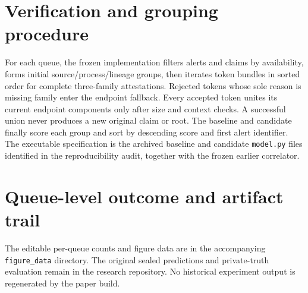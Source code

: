 \section{Verification and grouping procedure}
For each queue, the frozen implementation filters alerts and claims by availability, forms initial source/process/lineage groups, then iterates token bundles in sorted order for complete three-family attestations. Rejected tokens whose sole reason is missing family enter the endpoint fallback. Every accepted token unites its current endpoint components only after size and context checks. A successful union never produces a new original claim or root. The baseline and candidate finally score each group and sort by descending score and first alert identifier. The executable specification is the archived baseline and candidate \texttt{model.py} files identified in the reproducibility audit, together with the frozen earlier correlator.



\section{Queue-level outcome and artifact trail}
The editable per-queue counts and figure data are in the accompanying \texttt{figure\_data} directory. The original sealed predictions and private-truth evaluation remain in the research repository. No historical experiment output is regenerated by the paper build.



